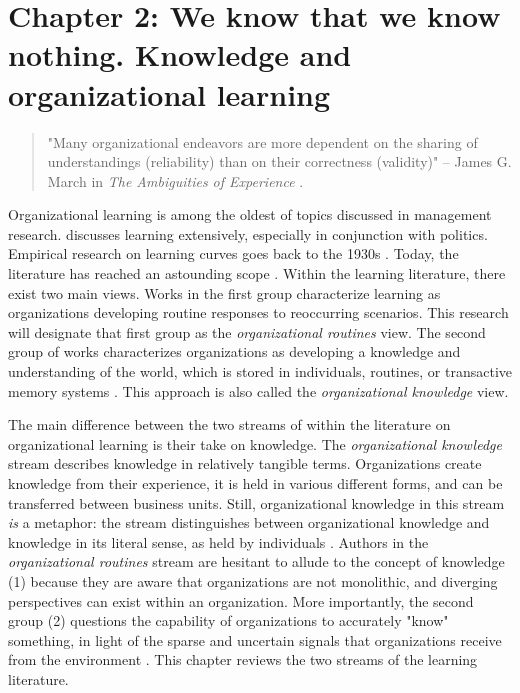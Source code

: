 \section{Chapter 2: We know that we know nothing. Knowledge and organizational learning}

\begin{singlespace}
	\begin{quote}
		"Many organizational endeavors are more dependent on the sharing of understandings (reliability) than on their correctness (validity)" -- James G. March in \textit{The Ambiguities of Experience} \citep[p. 69]{March2010}.
	\end{quote}
\end{singlespace}

Organizational learning is among the oldest of topics discussed in management research. \citet{March1963} discusses learning extensively, especially in conjunction with politics. Empirical research on learning curves goes back to the 1930s \citep{Wright1936}. Today, the literature has reached an astounding scope \citep{Argote2013}. Within the learning literature, there exist two main views. Works in the first group characterize learning as organizations developing routine responses to reoccurring scenarios. This research will designate that first group as the \textit{organizational routines} view. The second group of works characterizes organizations as developing a knowledge and understanding of the world, which is stored in individuals, routines, or transactive memory systems \citep{Argote2011}. This approach is also called the \textit{organizational knowledge} view.

The main difference between the two streams of within the literature on organizational learning is their take on knowledge. The \textit{organizational knowledge} stream describes knowledge in relatively tangible terms. Organizations create knowledge from their experience, it is held in various different forms, and can be transferred between business units. Still, organizational knowledge in this stream \textit{is} a metaphor: the stream distinguishes between organizational knowledge and knowledge in its literal sense, as held by individuals \citep{Argote2011}. Authors in the \textit{organizational routines} stream are hesitant to allude to the concept of knowledge (1) because they are aware that organizations are not monolithic, and diverging perspectives can exist within an organization. More importantly, the second group (2) questions the capability of organizations to accurately "know" something, in light of the sparse and uncertain signals that organizations receive from the environment \citep{March1975}. This chapter reviews the two streams of the learning literature. 

